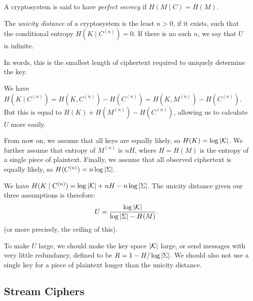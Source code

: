 \documentclass{article}
\begin{document}
\begin{note}
	A cryptosystem is said to have \textit{perfect secrecy} if $H(M \mid C) = H(M)$.
\end{note}

\begin{definition}
    The \textit{unicity distance} of a cryptosystem is the least $n > 0$, if it exists, such that the conditional entropy $H(K \mid C^{(n)}) = 0$. If there is no such $n$, we say that $U$ is infinite.
    
    In words, this is the smallest length of ciphertext required to uniquely determine the key.
\end{definition}

\begin{corollary}
    We have $H(K \mid C^{(n)}) = H(K, C^{(n)}) - H(C^{(n)}) = H(K, M^{(n)}) - H(C^{(n)})$. But this is equal to $H(K) + H(M^{(n)}) - H(C^{(n)})$, allowing us to calculate $U$ more easily.
\end{corollary}

\begin{note}
	From now on, we assume that all keys are equally likely, so $H(K) = \log \left\lvert \mathcal{K} \right\rvert$. We further assume that entropy of $M^{(n)}$ is $nH$, where $H = H(M)$ is the entropy of a single piece of plaintext. Finally, we assume that all observed ciphertext is equally likely, so $H(C^{(n)}) = n \log \left\lvert \Sigma \right\rvert$.
\end{note}

\begin{corollary}
    We have $H(K \mid C^{(n)}) = \log \left\lvert \mathcal{K} \right\rvert + nH - n \log \left\lvert \Sigma \right\rvert$. The unicity distance given our three assumptions is therefore:
    \[
	U = \frac{\log \left\lvert \mathcal{K} \right\rvert}{\log \left\lvert \Sigma \right\rvert - H(M)}.
	\]
	(or more precisely, the ceiling of this).
\end{corollary}

\begin{corollary}
    To make $U$ large, we should make the key space $\left\lvert \mathcal{K} \right\rvert$ large, or send messages with very little redundancy, defined to be $R = 1 - H/\log\left\lvert \Sigma \right\rvert$. We should also not use a single key for a piece of plaintext longer than the unicity distance.
\end{corollary}


\subsection{Stream Ciphers}
\label{section-cryptography-stream-ciphers}
\end{document}
